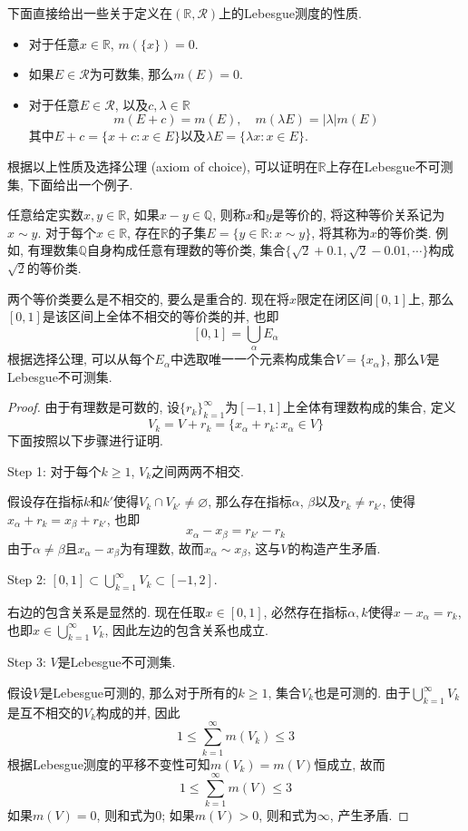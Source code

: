 \documentclass[cn, 12pt, math=mtpro2, bibstyle=apa, blue, twocol]{elegantbook}
\newcommand{\R}{\mathbb{R}}
\let\emptyset\varnothing
\begin{document}
下面直接给出一些关于定义在$(\R,\mathcal{R})$上的Lebesgue测度的性质.
\begin{itemize}
  \item 对于任意$x\in\R$, $m(\{x\})=0$.
  \item 如果$E\in\mathcal{R}$为可数集, 那么$m(E)=0$.
  \item 对于任意$E\in\mathcal{R}$, 以及$c,\lambda\in\R$
  $$m(E+c)=m(E),\quad m(\lambda E)=|\lambda|m(E)$$
  其中$E+c=\{x+c:x\in E\}$以及$\lambda E=\{\lambda x:x\in E\}$.
\end{itemize}
根据以上性质及选择公理 (axiom of choice), 可以证明在$\R$上存在Lebesgue不可测集, 下面给出一个例子.
\begin{example}[$\,$Lebesgue不可测集]
任意给定实数$x,y\in\R$, 如果$x- y\in\mathbb{Q}$, 则称$x$和$y$是等价的, 将这种等价关系记为$x\sim y$. 对于每个$x\in\R$, 存在$\R$的子集$E=\{y\in\R: x\sim y\}$, 将其称为$x$的等价类. 例如, 有理数集$\mathbb{Q}$自身构成任意有理数的等价类, 集合$\{\sqrt{2}+0.1,\sqrt{2}-0.01,\cdots\}$构成$\sqrt{2}$的等价类.

两个等价类要么是不相交的, 要么是重合的. 现在将$x$限定在闭区间$[0,1]$上, 那么$[0,1]$是该区间上全体不相交的等价类的并, 也即
$$[0,1]=\bigcup_\alpha E_\alpha$$
根据选择公理, 可以从每个$E_\alpha$中选取唯一一个元素构成集合$V=\{x_\alpha\}$, 那么$V$是Lebesgue不可测集.
\end{example}
\begin{proof}
  由于有理数是可数的, 设$\{r_k\}_{k=1}^\infty$为$[-1,1]$上全体有理数构成的集合, 定义
  $$V_k=V+r_k=\{x_\alpha+r_k:x_\alpha\in V\}$$
  下面按照以下步骤进行证明.

  Step 1: 对于每个$k\geq1$, $V_k$之间两两不相交.

  假设存在指标$k$和$k'$使得$V_k\cap V_{k'}\neq \emptyset$, 那么存在指标$\alpha$, $\beta$以及$r_k\neq r_{k'}$, 使得$x_\alpha+r_k=x_\beta+r_{k'}$, 也即
  $$x_\alpha-x_\beta=r_{k'}-r_k$$
  由于$\alpha\neq \beta$且$x_\alpha-x_\beta$为有理数, 故而$x_\alpha\sim x_\beta$, 这与$V$的构造产生矛盾.

  Step 2: $[0,1]\subset \bigcup_{k=1}^\infty V_k\subset [-1,2]$.

  右边的包含关系是显然的. 现在任取$x\in[0,1]$, 必然存在指标$\alpha, k$使得$x-x_\alpha=r_k$, 也即$x\in \bigcup_{k=1}^\infty V_k$, 因此左边的包含关系也成立.

  Step 3: $V$是Lebesgue不可测集.

  假设$V$是Lebesgue可测的, 那么对于所有的$k\geq1$, 集合$V_k$也是可测的. 由于$\bigcup_{k=1}^\infty V_k$是互不相交的$V_k$构成的并, 因此
  $$1\leq \sum_{k=1}^{\infty}m(V_k)\leq 3$$
  根据Lebesgue测度的平移不变性可知$m(V_k)=m(V)$恒成立, 故而
  $$1\leq \sum_{k=1}^{\infty}m(V)\leq 3$$
  如果$m(V)=0$, 则和式为0; 如果$m(V)>0$, 则和式为$\infty$, 产生矛盾.
\end{proof}
\end{document}
